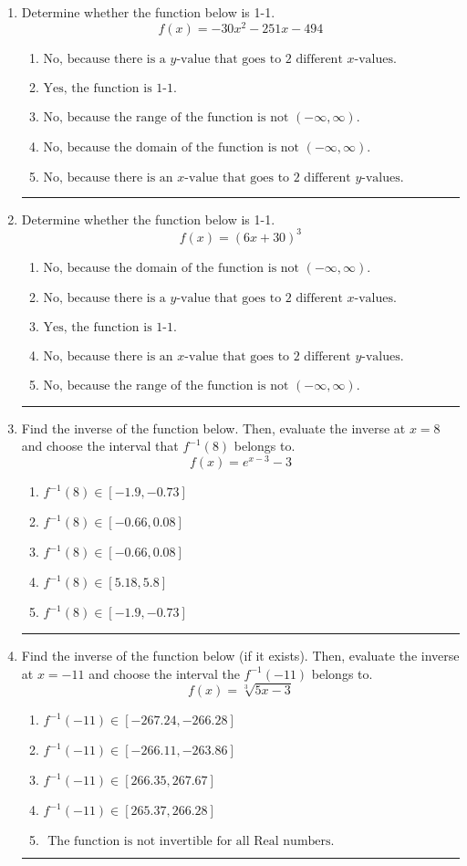 \documentclass[14pt]{extbook}
\newcommand{\litem}[1]{\item#1\hspace*{-1cm}\rule{\textwidth}{0.4pt}}
\begin{document}
\begin{enumerate}
{\begin{enumerate}[label=\Alph*.]
\end{enumerate} }
\litem{
Determine whether the function below is 1-1.\[ f(x) = -30 x^2 - 251 x - 494 \]\begin{enumerate}[label=\Alph*.]
\item \( \text{No, because there is a $y$-value that goes to 2 different $x$-values.} \)
\item \( \text{Yes, the function is 1-1.} \)
\item \( \text{No, because the range of the function is not $(-\infty, \infty)$.} \)
\item \( \text{No, because the domain of the function is not $(-\infty, \infty)$.} \)
\item \( \text{No, because there is an $x$-value that goes to 2 different $y$-values.} \)

\end{enumerate} }
\litem{
Determine whether the function below is 1-1.\[ f(x) = (6 x + 30)^3 \]\begin{enumerate}[label=\Alph*.]
\item \( \text{No, because the domain of the function is not $(-\infty, \infty)$.} \)
\item \( \text{No, because there is a $y$-value that goes to 2 different $x$-values.} \)
\item \( \text{Yes, the function is 1-1.} \)
\item \( \text{No, because there is an $x$-value that goes to 2 different $y$-values.} \)
\item \( \text{No, because the range of the function is not $(-\infty, \infty)$.} \)

\end{enumerate} }
\litem{
Find the inverse of the function below. Then, evaluate the inverse at $x = 8$ and choose the interval that $f^{-1}(8)$ belongs to.\[ f(x) = e^{x-3}-3 \]\begin{enumerate}[label=\Alph*.]
\item \( f^{-1}(8) \in [-1.9, -0.73] \)
\item \( f^{-1}(8) \in [-0.66, 0.08] \)
\item \( f^{-1}(8) \in [-0.66, 0.08] \)
\item \( f^{-1}(8) \in [5.18, 5.8] \)
\item \( f^{-1}(8) \in [-1.9, -0.73] \)

\end{enumerate} }
\litem{
Find the inverse of the function below (if it exists). Then, evaluate the inverse at $x = -11$ and choose the interval the $f^{-1}(-11)$ belongs to.\[ f(x) = \sqrt[3]{5 x - 3} \]\begin{enumerate}[label=\Alph*.]
\item \( f^{-1}(-11) \in [-267.24, -266.28] \)
\item \( f^{-1}(-11) \in [-266.11, -263.86] \)
\item \( f^{-1}(-11) \in [266.35, 267.67] \)
\item \( f^{-1}(-11) \in [265.37, 266.28] \)
\item \( \text{ The function is not invertible for all Real numbers. } \)


\end{enumerate}}
\end{enumerate}
\end{document}
